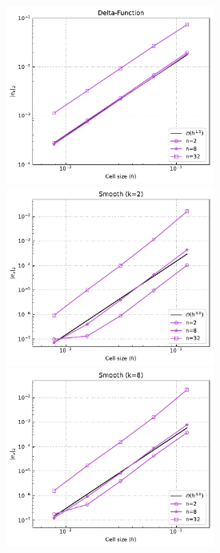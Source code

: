 \documentclass[12pt]{article}
\numberwithin{equation}{subsection}
\begin{document}
\begin{figure}
	\begin{multicols}{3}
		\includegraphics[width=6.85cm]{../Annulus_Benchmark_Kramer/benchmark_figs/case1_k_0_vel_err_conv_vel_penalty_2.5e+08_stokes_tol_1.0e-10.pdf}\par
		\hspace{-0.08in}
		\includegraphics[width=6.85cm]{../Annulus_Benchmark_Kramer/benchmark_figs/case2_k_2_vel_err_conv_vel_penalty_2.5e+08_stokes_tol_1.0e-10.pdf}\par
		\hspace{-0.12in}
		\includegraphics[width=6.85cm]{../Annulus_Benchmark_Kramer/benchmark_figs/case2_k_8_vel_err_conv_vel_penalty_2.5e+08_stokes_tol_1.0e-10.pdf}
	\end{multicols}
	
	\vspace{-0.35in}
	

\end{figure}
\end{document}
